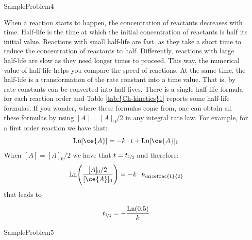 \documentclass[main.tex]{subfiles}
\newcommand\chapterlabel{Ch-kinetics}
\begin{document}
\begin{description}
  {SampleProblem4}


\item[\docfilehook{Half-life, $t_{\nicefrac{1}{2}}$}{}] 
When a reaction starts to happen, the concentration of reactants decreases with time. Half-life is the time at which the initial concentration of reactants is half its initial value. Reactions with small half-life are fast, as they take a short time to reduce the concentration of reactants to half. Differently, reactions with large half-life are slow as they need longer times to proceed. This way, the numerical value of half-life helps you compare the speed of reactions. At the same time, the half-life is a transformation of the rate constant into a time value. That is, by rate constants can be converted into half-lives.
There is a single half-life formula for each reaction order and Table \ref{tab:{\chapterlabel}1} reports some half-life formulas. 
If you wonder, where these formulas come from, one can obtain all these formulas by using $[A]=[A]_0/2$ in any integral rate law. For example, for a first order reaction we have that:
\[\text{Ln}[\ce{A}]=-k\cdot t+\text{Ln}[\ce{A}]_0 \]
When $[A]=[A]_0/2$ we have that $t=t_{\nicefrac{1}{2}}$ and therefore:
\[\text{Ln}\Bigg(\frac{[A]_0/2}{[\ce{A}]_0}\Bigg)=-k\cdot t_{\nicefrac{1}{2}}\] that leads to

\[t_{\nicefrac{1}{2}}=-\frac{\text{Ln}(0.5)}{k} \]

\end{description}

  {SampleProblem5}
\end{document}
